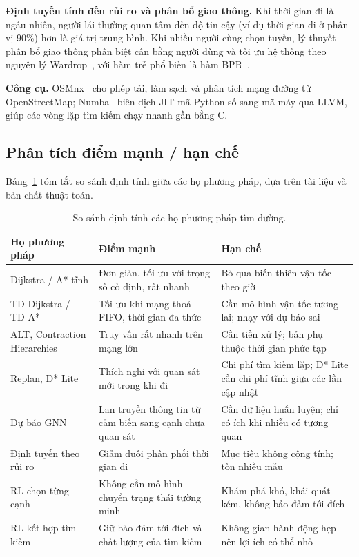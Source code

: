 \textbf{Định tuyến tính đến rủi ro và phân bổ giao thông.} Khi thời gian đi là ngẫu nhiên, người lái thường quan tâm đến
độ tin cậy (ví dụ thời gian đi ở phân vị 90\%) hơn là giá trị trung bình. Khi nhiều người cùng chọn tuyến, lý thuyết phân
bổ giao thông phân biệt cân bằng người dùng và tối ưu hệ thống theo nguyên lý Wardrop~\cite{wardrop1952}, với hàm trễ phổ
biến là hàm BPR~\cite{bpr1964}.

\textbf{Công cụ.} OSMnx~\cite{boeing2017} cho phép tải, làm sạch và phân tích mạng đường từ OpenStreetMap; Numba~\cite{lam2015numba}
biên dịch JIT mã Python số sang mã máy qua LLVM, giúp các vòng lặp tìm kiếm chạy nhanh gần bằng C.

\subsection{Phân tích điểm mạnh / hạn chế}\label{sec:related:compare}

Bảng~\ref{tab:compare} tóm tắt so sánh định tính giữa các họ phương pháp, dựa trên tài liệu và bản chất thuật toán.

\begin{table}[H]
\centering\small
\renewcommand{\arraystretch}{1.25}
\caption{So sánh định tính các họ phương pháp tìm đường.}
\label{tab:compare}
\begin{tabularx}{\linewidth}{>{\raggedright\arraybackslash}p{3.3cm}XX}
\toprule
\textbf{Họ phương pháp} & \textbf{Điểm mạnh} & \textbf{Hạn chế} \\
\midrule
Dijkstra / A* tĩnh & Đơn giản, tối ưu với trọng số cố định, rất nhanh & Bỏ qua biến thiên vận tốc theo giờ \\
TD-Dijkstra / TD-A* & Tối ưu khi mạng thoả FIFO, thời gian đa thức & Cần mô hình vận tốc tương lai; nhạy với dự báo sai \\
ALT, Contraction Hierarchies & Truy vấn rất nhanh trên mạng lớn & Cần tiền xử lý; bản phụ thuộc thời gian phức tạp \\
Replan, D* Lite & Thích nghi với quan sát mới trong khi đi & Chi phí tìm kiếm lặp; D* Lite cần chi phí tĩnh giữa các lần cập nhật \\
Dự báo GNN & Lan truyền thông tin từ cảm biến sang cạnh chưa quan sát & Cần dữ liệu huấn luyện; chỉ có ích khi nhiễu có tương quan \\
Định tuyến theo rủi ro & Giảm đuôi phân phối thời gian đi & Mục tiêu không cộng tính; tốn nhiều mẫu \\
RL chọn từng cạnh & Không cần mô hình chuyển trạng thái tường minh & Khám phá khó, khái quát kém, không bảo đảm tới đích \\
RL kết hợp tìm kiếm & Giữ bảo đảm tới đích và chất lượng của tìm kiếm & Không gian hành động hẹp nên lợi ích có thể nhỏ \\
\bottomrule
\end{tabularx}
\end{table}

